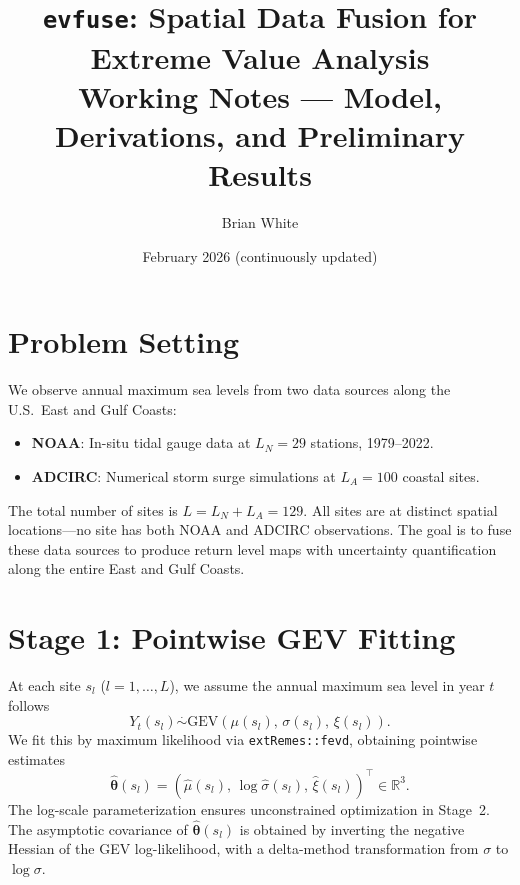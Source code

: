 \documentclass[11pt]{article}
\title{\texttt{evfuse}: Spatial Data Fusion for Extreme Value Analysis\\[6pt]
\large Working Notes --- Model, Derivations, and Preliminary Results}
\author{Brian White}
\date{February 2026 (continuously updated)}
\newcommand{\bbR}{\mathbb{R}}
\newcommand{\btheta}{\bm{\theta}}
\begin{document}
\maketitle
\tableofcontents
\newpage

\section{Problem Setting}

We observe annual maximum sea levels from two data sources along the U.S.\ East and Gulf Coasts:
\begin{itemize}[nosep]
    \item \textbf{NOAA}: In-situ tidal gauge data at $L_N = 29$ stations, 1979--2022.
    \item \textbf{ADCIRC}: Numerical storm surge simulations at $L_A = 100$ coastal sites.
\end{itemize}
The total number of sites is $L = L_N + L_A = 129$. All sites are at distinct spatial locations---no site has both NOAA and ADCIRC observations. The goal is to fuse these data sources to produce return level maps with uncertainty quantification along the entire East and Gulf Coasts.

\section{Stage 1: Pointwise GEV Fitting}

At each site $s_l$ ($l = 1, \ldots, L$), we assume the annual maximum sea level in year $t$ follows
\[
Y_t(s_l) \overset{\cdot}{\sim} \text{GEV}(\mu(s_l),\, \sigma(s_l),\, \xi(s_l)).
\]
We fit this by maximum likelihood via \texttt{extRemes::fevd}, obtaining pointwise estimates
\[
\hat{\btheta}(s_l) = (\hat{\mu}(s_l),\, \log\hat{\sigma}(s_l),\, \hat{\xi}(s_l))^\top \in \bbR^3.
\]
The log-scale parameterization ensures unconstrained optimization in Stage~2. The asymptotic covariance of $\hat{\btheta}(s_l)$ is obtained by inverting the negative Hessian of the GEV log-likelihood, with a delta-method transformation from $\sigma$ to $\log\sigma$.
\end{document}
